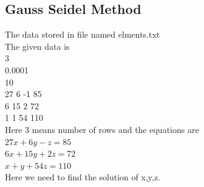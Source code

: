 \documentclass{article}
\begin{document}
\subsection{Gauss Seidel Method}
The data stored in file named elments.txt\\
The given data is \\
3\\
0.0001\\
10\\
27 6 -1 85\\
6 15 2 72\\
1 1 54 110\\
Here 3 means number of rows and the equations are \\
$27x+6y-z = 85$\\
$6x+15y+2z = 72$\\
$x+y+54z = 110$\\
Here we need to find the solution of x,y,z.
\end{document}

